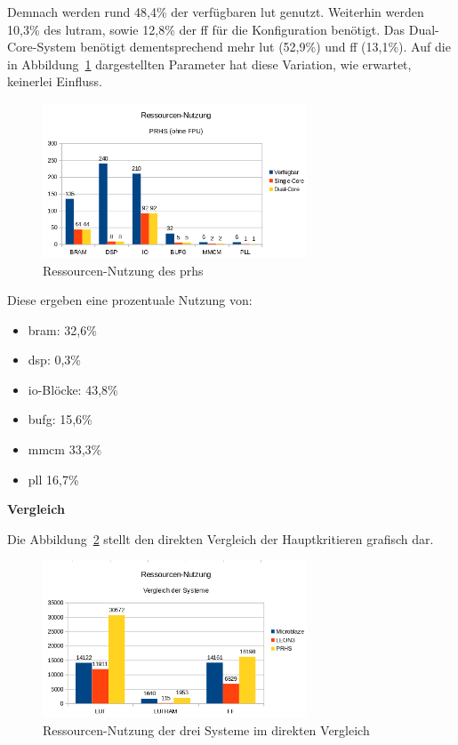 Demnach werden rund 48,4\% der verfügbaren \ac{lut} genutzt. Weiterhin werden 10,3\% des \ac{lutram}, sowie 12,8\% der \ac{ff} für die Konfiguration benötigt. Das Dual-Core-System benötigt
dementsprechend mehr \ac{lut} (52,9\%) und \ac{ff} (13,1\%). Auf die in Abbildung~\ref{fig:ressourcenprhs2} dargestellten Parameter hat diese Variation, wie erwartet, keinerlei Einfluss.\\

\begin{figure}[H]
\centering
\includegraphics[width=0.7\textwidth]{Hauptteil/ressourcenprhs2.png}
\caption{Ressourcen-Nutzung des \ac{prhs}}
\label{fig:ressourcenprhs2}
\end{figure}

Diese ergeben eine prozentuale Nutzung von:\\
\begin{itemize}
  \item \ac{bram}: 32,6\%
  \item \ac{dsp}:  0,3\%
  \item \ac{io}-Blöcke: 43,8\%
  \item \ac{bufg}: 15,6\%
  \item \ac{mmcm} 33,3\%
  \item \ac{pll} 16,7\%
\end{itemize}


\textbf{Vergleich}

Die Abbildung~\ref{fig:ressourcenresult} stellt den direkten Vergleich der Hauptkritieren grafisch dar.\\

\begin{figure}[H]
\centering
\includegraphics[width=0.7\textwidth]{Hauptteil/ressourcenresult.png}
\caption{Ressourcen-Nutzung der drei Systeme im direkten Vergleich}
\label{fig:ressourcenresult}
\end{figure}

